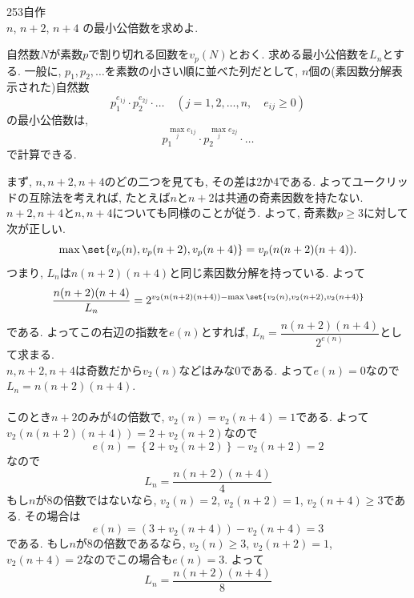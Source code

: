\begin{prob}{253}{}{自作} \quad \\
$n$, $n+2$, $n+4$ の最小公倍数を求めよ.
\end{prob}

自然数$N$が素数$p$で割り切れる回数を$v_{p}(N)$とおく. 求める最小公倍数を$L_n$とする. 一般に, $p_1,p_2,\dots$を素数の小さい順に並べた列だとして, $n$個の(素因数分解表示された)自然数
\[
p_{1}^{e_{1j}}\cdot p_2^{e_{2j}} \cdot \dots \quad (j=1,2,\dots, n,\quad e_{ij} \geq 0)
\]
の最小公倍数は, 
\[p_1^{\max_{j} e_{1j}}\cdot p_2^{\max_{j} e_{2j}}\cdot \dots \]
で計算できる. \par 
まず, $n,n+2,n+4$のどの二つを見ても, その差は2か4である. よってユークリッドの互除法を考えれば, たとえば$n$と$n+2$は共通の奇素因数を持たない. $n+2,n+4$と$n,n+4$についても同様のことが従う. よって, 奇素数$p\geq 3$に対して次が正しい. 
\[\max{\set{v_{p}(n),v_{p}(n+2),v_{p}(n+4)}} = v_{p}(n(n+2)(n+4)).\]
つまり,  $L_n$は$n(n+2)(n+4)$と同じ素因数分解を持っている. よって
\[\dfrac{n(n+2)(n+4)}{L_n} = 2^{v_2(n(n+2)(n+4))- \max{\set{v_2(n), v_2(n+2), v_2(n+4)}}}\]
である. よってこの右辺の指数を$e(n)$とすれば, $L_n = \dfrac{n(n+2)(n+4)}{2^{e(n)}}$として求まる. \\
$n,n+2,n+4$は奇数だから$v_2(n)$などはみな0である. よって$e(n) = 0$なので$L_n=n(n+2)(n+4)$. \\
 \\
このとき$n+2$のみが4の倍数で, $v_2(n) = v_2(n+4) = 1$である. よって$v_2(n(n+2)(n+4)) = 2+v_2(n+2)$なので
\[e(n) = \left\{ 2+v_2(n+2)\right\} - v_2(n+2) = 2\]
なので
\[L_n = \dfrac{n(n+2)(n+4)}{4}\]
 もし$n$が8の倍数ではないなら, $v_2(n) = 2$, $v_2(n+2) = 1$, $v_2(n+4) \geq 3$である. その場合は
\[e(n) = (3+v_2(n+4)) - v_2(n+4) = 3 \]
である. もし$n$が8の倍数であるなら, $v_2(n)\geq 3$, $v_2(n+2) = 1$, $v_2(n+4) = 2$なのでこの場合も$e(n) = 3$. よって
\[L_n = \dfrac{n(n+2)(n+4)}{8}\]

